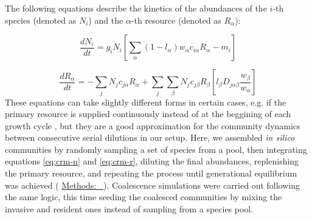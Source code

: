 \documentclass[a4paper,10pt]{article}
\newcommand{\methodsref}[1]{%
  \hyperref[{methods:#1}]{%
   Methods:~\nameref*{methods:#1}%
  }%
}
\begin{document}
\begin{mdframed}
The following equations describe the kinetics of the abundances
of the $i$-th species (denoted as $N_i$)
and the $\alpha$-th resource (denoted as $R_\alpha$):

\begin{equation}
\frac{dN_i}{dt} = 
g_i N_i
\left[
\sum_\alpha \left( 1-l_\alpha \right)
w_\alpha c_{i\alpha} R_\alpha
- m_i
\right]
\label{eq:crm-n}
\end{equation}

\begin{equation}
\frac{dR_\alpha}{dt} = 
- \sum_j N_j c_{j\alpha} R_\alpha
+ \sum_j \sum_\beta N_j c_{j\beta} R_\beta
\left[
l_\beta D_{j\alpha\beta} \frac{w_\beta}{w_\alpha}
\right]
\label{eq:crm-r}
\end{equation}
%
These equations can take slightly different forms in certain cases,
e.g. if the primary resource is supplied continuously instead of at the beggining
of each growth cycle \cite{Marsland2019,Marsland2020},
but they are a good approximation for the community dynamics between consecutive
serial dilutions in our setup.
Here, we assembled \textit{in silico} communities by randomly
sampling a set of species from a pool,
then integrating equations \ref{eq:crm-n} and \ref{eq:crm-r},
diluting the final abundances,
replenishing the primary resource,
and repeating the process until generational equilibrium was achieved
(\methodsref{sim}).
Coalescence simulations were carried out following the same logic,
this time seeding the coalesced communities by mixing the invasive and resident
ones instead of sampling from a species pool.

\bigskip
\end{mdframed}

\clearpage
\end{document}
